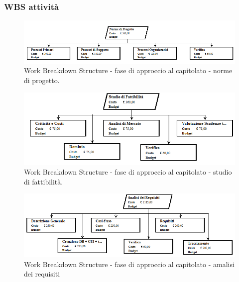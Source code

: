 \documentclass[a4paper]{article}
\begin{document}
			\subsubsection{WBS attività}
				\begin{figure}[H]
					\centering
					\includegraphics[width=\textwidth]{wbs/wbs_approccio_1}
					\caption{Work Breakdown Structure - fase di approccio al capitolato - norme di progetto. }
				\end{figure}
				\begin{figure}[H]
					\centering
					\includegraphics[width=\textwidth]{wbs/wbs_approccio_2}
					\caption{Work Breakdown Structure - fase di approccio al capitolato - studio di fattibilità.}
				\end{figure}
				\begin{figure}[H]
					\centering
					\includegraphics[width=\textwidth]{wbs/wbs_approccio_3}
					\caption{Work Breakdown Structure - fase di approccio al capitolato - amalisi dei requisiti}
				\end{figure}
\end{document}
